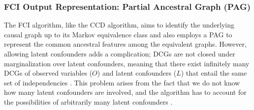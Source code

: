 \documentclass[twoside, 11pt]{article}
\begin{document}


\subsubsection{FCI Output Representation: Partial Ancestral Graph (PAG)}\label{fcipag}
The FCI algorithm, like the CCD algorithm, aims to identify the underlying causal graph up to its Markov equivalence class and also employs a PAG to represent the common ancestral features among the equivalent graphs.
However, allowing latent confounders adds a complication; DCGs are not closed under marginalization over latent confounders, meaning that there exist infinitely many DCGs of observed variables ($O$) and latent confounders ($L$) that entail the same set of independencies \citep{Richardson2002}. This problem arises from the fact that we do not know how many latent confounders are involved, and the algorithm has to account for the possibilities of arbitrarily many latent confounders \citep{zhang_characterization_2005}. 
\end{document}
